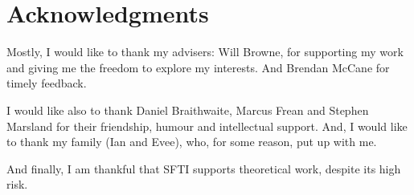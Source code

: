 \chapter*{Acknowledgments}\label{C:ack}

Mostly, I would like to thank my advisers: Will Browne, for supporting my work and giving me the freedom to explore my interests.
And Brendan McCane for timely feedback.

I would like also to thank Daniel Braithwaite, Marcus Frean and Stephen Marsland
for their friendship, humour and intellectual support.
And, I would like to thank my family (Ian and Evee), who, for some reason, put up with me.

And finally, I am thankful that SFTI supports theoretical work, despite its high risk.

